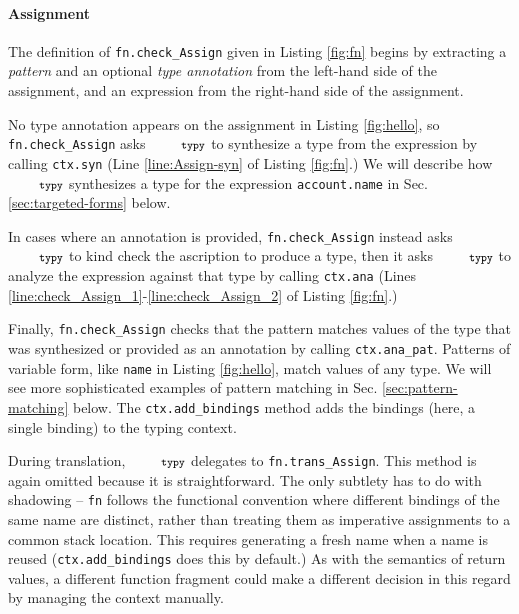 \documentclass[10pt]{sigplanconf}
\newcommand{\typy}{\texttt{\footnotesize typy}}
\newcommand{\lip}[1]{\lstinline[language=Python,basicstyle=\ttfamily\footnotesize,morekeywords={with},deletendkeywords={tuple,buffer,map}]{#1}}
\newcommand{\li}[1]{\lip{#1}}
\begin{document}
\paragraph{Assignment}
The definition of \li{fn.check_Assign} given in Listing \ref{fig:fn} begins by extracting a \emph{pattern} and an optional \emph{type annotation} from the left-hand side of the assignment, and an expression from the right-hand side of the assignment. 


No type annotation appears on the assignment in Listing \ref{fig:hello}, so \li{fn.check_Assign} asks $\typy$ to synthesize a type from the expression by calling \li{ctx.syn} (Line \ref{line:Assign-syn} of Listing \ref{fig:fn}.) We will describe how $\typy$ synthesizes a type for the expression \li{account.name} in Sec. \ref{sec:targeted-forms} below.

In cases where an annotation is provided, \li{fn.check_Assign} instead  asks $\typy$ to kind check the ascription to produce a type, then it asks $\typy$ to analyze the expression against that type by calling \li{ctx.ana} (Lines \ref{line:check_Assign_1}-\ref{line:check_Assign_2} of Listing \ref{fig:fn}.)

Finally, \li{fn.check_Assign} checks that the pattern matches values of the type that was synthesized or provided as an annotation by calling \li{ctx.ana_pat}. Patterns of variable form, like \li{name} in Listing \ref{fig:hello}, match values of any type. We will see more sophisticated examples of pattern matching in Sec. \ref{sec:pattern-matching} below. The \li{ctx.add_bindings} method adds the bindings (here, a single binding) to the typing context.

During translation, $\typy$ delegates to \li{fn.trans_Assign}. This method is again omitted because it is straightforward. The only subtlety has to do with shadowing -- \li{fn} follows the functional  convention where different bindings of the same name are distinct, rather than treating them as imperative assignments to a common stack location. This requires generating a fresh name when a name is reused (\li{ctx.add_bindings} does this by default.) As with the semantics of return values, a different function fragment could make a different decision in this regard by managing the context manually.
\end{document}
